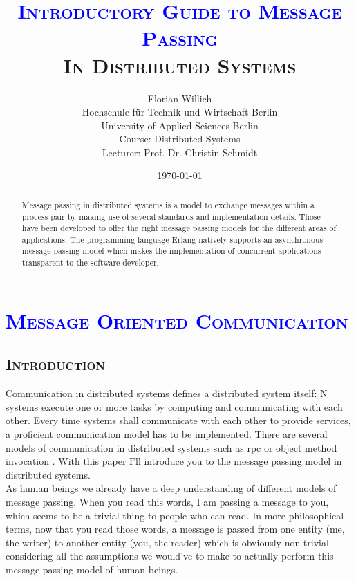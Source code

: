 \documentclass[xcolor=dvipsnames]{article}
\title{\scshape{\textbf{\textcolor{blue}{Introductory Guide to Message Passing}}\\In Distributed Systems}}
\author{Florian Willich \\ Hochschule f\"ur Technik und Wirtschaft Berlin \\ University of Applied Sciences Berlin \\ Course: Distributed Systems \\ Lecturer: Prof. Dr. Christin Schmidt}
\date{\today}
\begin{document}
\maketitle

\begin{abstract}

Message passing in distributed systems is a model to exchange messages within a process pair by making use of several standards and implementation details. Those have been developed to offer the right message passing models for the different areas of applications. The programming language Erlang natively supports an asynchronous message passing model which makes the implementation of concurrent applications transparent to the software developer.

\end{abstract}

\tableofcontents

\newpage

\section{\scshape{\textcolor{blue}{Message Oriented Communication}}} \label{introduction}

\subsection{\scshape{Introduction}}

Communication in distributed systems defines a distributed system itself: N systems execute one or more tasks by computing and communicating with each other. Every time systems shall communicate with each other to provide services, a proficient communication model has to be implemented. There are several models of communication in distributed systems such as \gls{rpc} or object method invocation \cite[chap. 4.3 / p. 203]{tanenbaum}. With this paper I'll introduce you to the message passing model in distributed systems.\\

\noindent As human beings we already have a deep understanding of different models of message passing. When you read this words, I am passing a message to you, which seems to be a trivial thing to people who can read. In more philosophical terms, now that you read those words, a message is passed from one entity (me, the writer) to another entity (you, the reader) which is obviously non trivial considering all the assumptions we would've to make to actually perform this message passing model of human beings.\\
\end{document}
